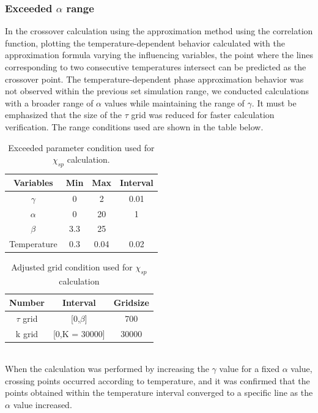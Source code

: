 \documentclass{article}
\begin{document}
\begin{spacing}{1.3}
\subsubsection*{Exceeded $\alpha$ range}
In the crossover calculation using the approximation method using the correlation function, 
plotting the temperature-dependent behavior calculated with the approximation formula varying the influencing variables, 
the point where the lines corresponding to two consecutive temperatures intersect can be predicted as the crossover point.
The temperature-dependent phase approximation behavior was not observed within the previous set simulation range, 
we conducted calculations with a broader range of $\alpha$ values while maintaining the range of $\gamma$. 
It must be emphasized that the size of the $\tau$ grid was reduced for faster calculation verification. 
The range conditions used are shown in the table below.
\begin{table}[htbp]
  \centering
  \renewcommand{\arraystretch}{1.2}  %
  \begin{tabular}{@{}cccc@{}}
  \toprule
  \textbf{Variables} & \textbf{Min} & \textbf{Max}  & \textbf{Interval}\\ 
  \midrule
  $\gamma$ & 0 & 2 & 0.01 \\
  $\alpha$ & 0 & 20 & 1 \\
  $\beta$ & 3.3 & 25 &  \\
  Temperature & 0.3 & 0.04 & 0.02 \\
  \bottomrule
  \end{tabular}
  \caption{Exceeded parameter condition used for $\chi_{sp}$ calculation.}
  \end{table}
\begin{table}[htbp]
  \centering
  \renewcommand{\arraystretch}{1.2}  %
  \begin{tabular}{@{}ccc@{}}
  \toprule
  \textbf{Number} & \textbf{Interval} & \textbf{Gridsize}\\ 
  \midrule
  $\tau$ grid & [0,$\beta$] & 700 \\
  k grid & [0,K = 30000] & 30000 \\
  \bottomrule
  \end{tabular}
  \caption{Adjusted grid condition used for $\chi_{sp}$ calculation}
  \end{table}
\\
When the calculation was performed by increasing the $\gamma$ value for a fixed $\alpha$ value, crossing points occurred according to temperature, 
and it was confirmed that the points obtained within the temperature interval converged to a specific line as the $\alpha$ value increased. 

\end{spacing}
\end{document}
